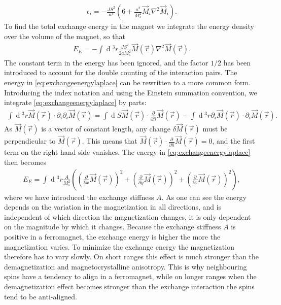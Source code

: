 \documentclass[12pt, a4paper]{article}		%
\renewcommand{\d}[1]{\ensuremath{\operatorname{d}\!{#1}}}
\numberwithin{equation}{section}
\begin{document}
\begin{align}
\epsilon_i = -\frac{JS^2}{a^3}(6+\frac{a^2}{M_s^2}\vec{M}_i\nabla^2\vec{M}_i).
\end{align}
To find the total exchange energy in the magnet we integrate the energy density over the volume of the magnet, so that
\begin{align}
\label{eq:exchangeenergylaplace}
E_E = -\int \d {^3}r \frac{JS^2}{2aM_s^2} \vec{M}(\vec{r})\nabla^2\vec{M}(\vec{r}).
\end{align}
The constant term in the energy has been ignored, and the factor $1/2$ has been introduced to account for the double counting of the interaction pairs. The energy in \eqref{eq:exchangeenergylaplace} can be rewritten to a more common form. Introducing the index notation and using the Einstein summation convention, we integrate \eqref{eq:exchangeenergylaplace} by parts: 
\begin{align}
\label{eq:exchangeenergyDiv2}
\int \d {^3}r \vec{M}(\vec{r})\cdot\partial_i \partial_i \vec{M}(\vec{r}) = \int \d S \vec{M}(\vec{r})\cdot \frac{\partial}{\partial \hat{n}}\vec{M}(\vec{r}) - \int \d {^3}r \partial_i  \vec{M}(\vec{r})\cdot\partial_i \vec{M}(\vec{r}).
\end{align}
As $\vec{M}(\vec{r})$ is a vector of constant length, any change $\delta \vec{M}(\vec{r})$ must be perpendicular to $\vec{M}(\vec{r})$. This means that $\vec{M}(\vec{r})\cdot \frac{\partial}{\partial \hat{n}}\vec{M}(\vec{r}) = 0$, and the first term on the right hand side vanishes. The energy in \eqref{eq:exchangeenergylaplace} then becomes
\begin{align}
\label{eq:exchangeenergy}
E_E = \int \d {^3}r \frac{A}{M_s^2} ((\frac{\partial}{\partial x}\vec{M}(\vec{r}))^2+(\frac{\partial}{\partial y}\vec{M}(\vec{r}))^2+(\frac{\partial}{\partial z}\vec{M}(\vec{r}))^2),
\end{align}
where we have introduced the exchange stiffness $A$. As one can see the energy depends on the variation in the magnetization in all directions, and is independent of which direction the magnetization changes, it is only dependent on the magnitude by which it changes. Because the exchange stiffness $A$ is positive in a ferromagnet, the exchange energy is higher the more the magnetization varies. To minimize the exchange energy the magnetization therefore has to vary slowly. On short ranges this effect is much stronger than the demagnetization and magnetocrystalline anisotropy. This is why neighbouring spins have a tendency to align in a ferromagnet, while on longer ranges when the demagnetization effect becomes stronger than the exchange interaction the spins tend to be anti-aligned.
\end{document}
